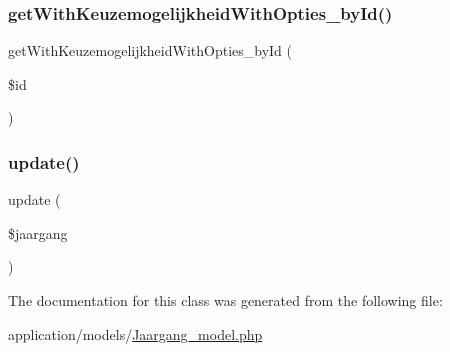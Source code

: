 \mbox{\label{class_jaargang__model_a4cee3ea918a63f7849b377135e365d35}} 
\subsubsection{\texorpdfstring{get\+With\+Keuzemogelijkheid\+With\+Opties\+\_\+by\+Id()}{getWithKeuzemogelijkheidWithOpties\_byId()}}
{\footnotesize\ttfamily get\+With\+Keuzemogelijkheid\+With\+Opties\+\_\+by\+Id (\begin{DoxyParamCaption}\item[{}]{\$id }\end{DoxyParamCaption})}

\mbox{\label{class_jaargang__model_a95dd2c7c418df525016de428cc3d1743}} 
\subsubsection{\texorpdfstring{update()}{update()}}
{\footnotesize\ttfamily update (\begin{DoxyParamCaption}\item[{}]{\$jaargang }\end{DoxyParamCaption})}



The documentation for this class was generated from the following file\+:\begin{DoxyCompactItemize}
\item 
application/models/\mbox{\hyperlink{_jaargang__model_8php}{Jaargang\+\_\+model.\+php}}\end{DoxyCompactItemize}
